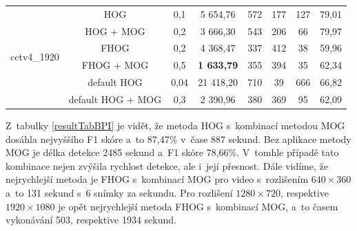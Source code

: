 \begin{table}[H]
\begin{tabular}{|c|c|c|c|c|c|c|c|}
\multirow{6}{*}{cctv4\_1920}& HOG &                    0,1        & 5 654,76         & 572 &   177 &     127&      79,01      \\ \cline{2-8}  
                              & HOG + MOG &            0,2        & 3 666,30         & 543 &   206 &      66&      79,97      \\ \cline{2-8}  
                              & FHOG &                 0,2        & 4 368,47         & 337 &   412 &     38 &      59,96      \\ \cline{2-8}  
                              & FHOG + MOG &           0,5        & \textbf{1 633,79}& 355 &   394 &     35 &      62,34      \\ \cline{2-8}  
                              &  default HOG &         0,04       & 21 418,20        & 710 &   39  &     666&      66,82      \\ \cline{2-8}  
                              &  default HOG + MOG &   0,3        & 2 390,96         & 380 &   369 &     95 &      62,09      \\ \hline  
\end{tabular}
\end{table}
Z~tabulky \ref{resultTabBPI} je vidět, že metoda HOG s~kombinací metodou MOG dosáhla nejvyššího F1 skóre a~to 87,47\% v~čase 887 sekund. Bez aplikace metody MOG je délka detekce 2485 sekund a~F1 skóre 78,66\%. V~tomhle případě tato kombinace nejen zvýšila rychlost detekce, ale i~její přesnost. Dále vidíme, že nejrychlejší metoda je FHOG s~kombinací MOG pro video s~rozlišením $640\times360$ a~to 131 sekund s~6 snímky za sekundu. Pro rozlišení $1280\times720$, respektive $1920\times1080$ je opět nejrychlejší metoda FHOG s~kombinací MOG, a~to časem vykonávání 503, respektive 1934 sekund.
